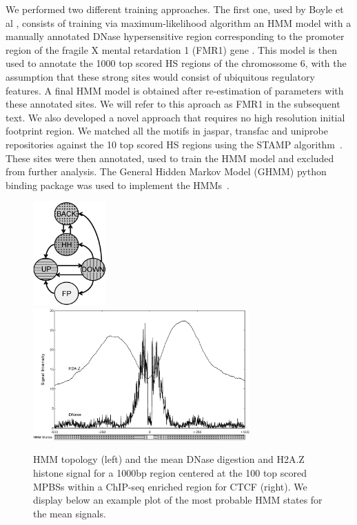 \documentclass[runningheads,a4paper]{llncs}
\begin{document}
We performed two different training approaches. The first one, used by
Boyle et al \cite{boyle2011}, consists of training via
maximum-likelihood algorithm an HMM model with a manually annotated
DNase hypersensitive region corresponding to the promoter region of
the fragile X mental retardation 1 (FMR1) gene \cite{drouin1997}. This
model is then used to annotate the 1000 top scored HS regions of the
chromossome 6, with the assumption that these strong sites would
consist of ubiquitous regulatory features. A final HMM model is
obtained after re-estimation of parameters with these annotated sites.
We will refer to this aproach as FMR1 in the subsequent text. We also
developed a novel approach that requires no high resolution initial
footprint region. We matched all the motifs in jaspar, transfac and
uniprobe repositories against the 10 top scored HS regions using the
STAMP algorithm~\cite{mahony2007}.  These sites were then annotated,
used to train the HMM model and excluded from further analysis.  The
General Hidden Markov Model (GHMM) python binding package was used to
implement the HMMs~\cite{ghmm2012}.

\begin{figure}
\vspace{0.0cm}
    \centering
    \includegraphics[width=0.25\textwidth]{Figs/Fig1a}
    \includegraphics[width=0.74\textwidth]{Figs/Fig1b}

    \caption{HMM topology (left) and the mean DNase digestion and H2A.Z
      histone signal for a 1000bp region centered at the 100 top scored 
      MPBSs within a ChIP-seq enriched region for CTCF (right). We
      display below an example plot of the most probable HMM states for the mean
      signals.}
    \label{Label1}
\vspace{0.0cm}
\end{figure}
\end{document}
